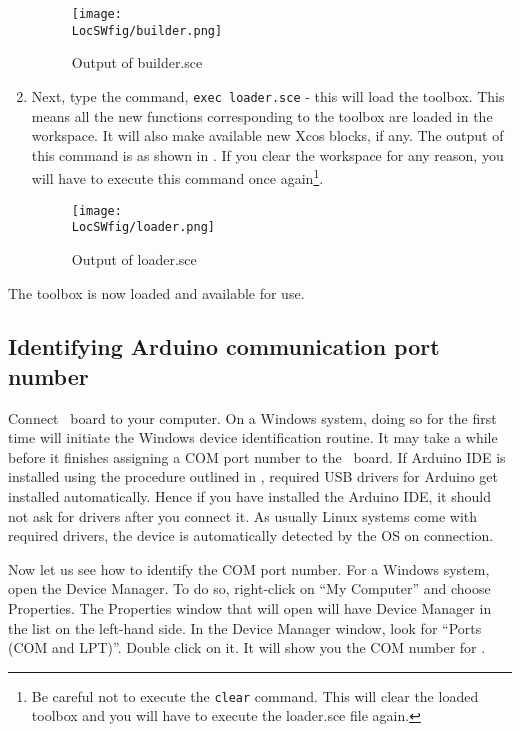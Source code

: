 \begin{enumerate}
            \begin{figure}
                  \centering
                  \texttt{[image: \\LocSWfig/builder.png]}
                  \caption{Output of builder.sce}
                  \label{builder}
            \end{figure}
      \item Next, type the command,
            {\tt exec loader.sce} -
            this will load the toolbox. This means all the new functions
            corresponding to the toolbox are loaded in the workspace. It
            will also make available new Xcos blocks, if any.  The
            output of this command is as shown in .  If you clear
            the workspace for any reason, you will have to execute this command
            once again\footnote{Be careful
                  not to execute the {\tt clear} command.  This will clear the loaded
                  toolbox and you will have to execute the loader.sce file again.}.
            \begin{figure}
                  \centering
                  \texttt{[image: \\LocSWfig/loader.png]}
                  \caption{Output of loader.sce}
                  \label{loader}
            \end{figure}
\end{enumerate}
The toolbox is now loaded and available for use. 

\subsection{Identifying Arduino communication port number}

Connect \arduino\ board to your computer. On a Windows system, doing
so for the first time will initiate the Windows device identification
routine. It may take a while before it finishes assigning a COM port
number to the \arduino\ board.  If Arduino IDE is installed using the
procedure outlined in , required USB drivers for
Arduino get installed automatically.  Hence if you have installed the
Arduino IDE, it should not ask for drivers after you connect it.  As
usually Linux systems come with required drivers, the device is
automatically detected by the OS on connection.

Now let us see how to identify the COM port number. For a Windows
system, open the Device Manager. To do so, right-click on ``My
Computer'' and choose Properties. The Properties window that will open
will have Device Manager in the list on the left-hand side. In the
Device Manager window, look for ``Ports (COM and LPT)''. Double click on
it. It will show you the COM number for \arduino. 

